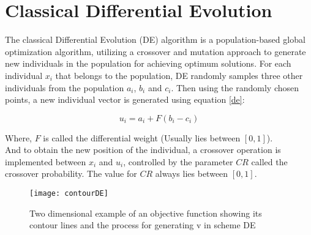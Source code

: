 
\section{Classical Differential Evolution}

The classical Differential Evolution (DE) algorithm is a population-based global optimization algorithm, utilizing a crossover and mutation approach to generate new individuals in the population for achieving optimum solutions\cite{das2011differential}. For each individual $x_i$ that belongs to the population, DE randomly samples three other individuals from the population $a_i$, $b_i$ and $c_i$. Then using the randomly chosen points, a new individual vector is generated using equation \eqref{de}:

\begin{equation}
\label{de}
u_i = a_i + F (b_i - c_i)
\end{equation}

Where, $F$ is called the differential weight (Usually lies between $[0, 1]$).\\
And to obtain the new position of the individual, a crossover operation is implemented between $x_i$ and $u_i$, controlled by the parameter $CR$ called the crossover probability. The value for $CR$ always lies between $[0, 1]$.

\begin{figure}[h!]
  \texttt{[image: contourDE]}
  \caption{Two dimensional example of an objective function showing its contour lines and the process for
generating v in scheme DE}
  \label{fig:contourDE}
\end{figure}


